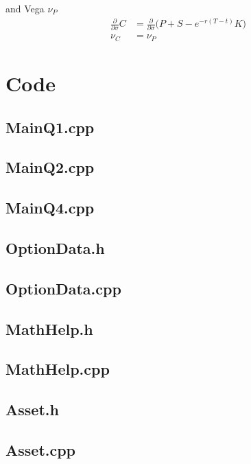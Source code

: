\documentclass[11pt]{article}
\begin{document}
and Vega $\nu_P$
\begin{align*}
	\frac{\partial}{\partial \sigma} C &= \frac{\partial}{\partial \sigma} \big(P + S - e^{-r(T - t)}K \big) \\
	\nu_C &= \nu_P
\end{align*}

\newpage
\section{Code}
\subsection{MainQ1.cpp}


\subsection{MainQ2.cpp}


\subsection{MainQ4.cpp}


\subsection{OptionData.h}

\subsection{OptionData.cpp}


\subsection{MathHelp.h}

\subsection{MathHelp.cpp}


\subsection{Asset.h}

\subsection{Asset.cpp}

\end{document}
